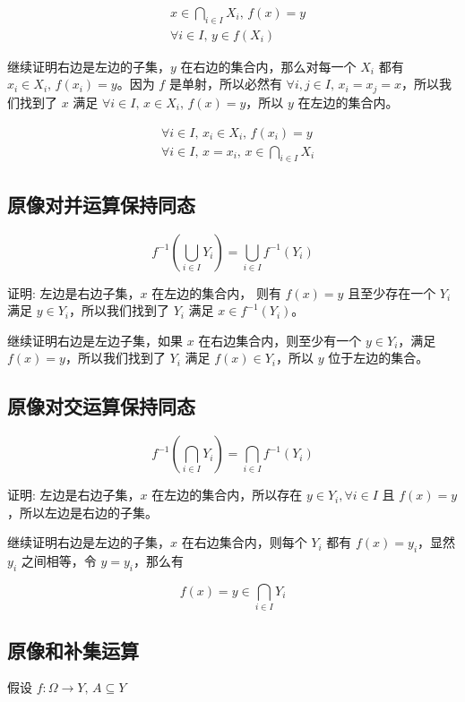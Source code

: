 \begin{align*}
    & x \in \bigcap_{i \in I}X_i,\, f(x) = y \\
    & \forall i \in I,\, y \in f(X_i)
\end{align*}

继续证明右边是左边的子集，$y$ 在右边的集合内，那么对每一个 $X_i$ 都有 $x_i \in X_i,\, f(x_i) = y$。因为 $f$ 是单射，所以必然有 $\forall i,j \in I,\, x_i = x_j = x$，所以我们找到了
$x$ 满足 $\forall i \in I,\, x \in X_i,\, f(x) = y$，所以 $y$ 在左边的集合内。


\begin{align*}
    & \forall i \in I,\, x_i \in X_i,\, f(x_i) = y \\
    & \forall i \in I,\, x = x_i,\, x \in \bigcap_{i \in I}X_i
\end{align*}

\subsection{原像对并运算保持同态}

\[
f^{-1}(\bigcup_{i \in I} Y_i) = \bigcup_{i \in I} f^{-1}(Y_i)
\]


证明: 左边是右边子集，$x$ 在左边的集合内， 则有 $f(x) = y$ 且至少存在一个 $Y_i$ 满足 $y \in Y_i$，所以我们找到了 $Y_i$ 满足 $x \in f^{-1}(Y_i)$。

继续证明右边是左边子集，如果 $x$ 在右边集合内，则至少有一个 $y \in Y_i$，满足 $f(x) = y$，所以我们找到了 $Y_i$ 满足 $f(x) \in Y_i$，所以 
$y$ 位于左边的集合。


\subsection{原像对交运算保持同态}


\[
f^{-1}(\bigcap_{i \in I}Y_i) = \bigcap_{i \in I}f^{-1}(Y_i)
\]

证明: 左边是右边子集，$x$ 在左边的集合内，所以存在 $y \in Y_i, \forall i \in I$ 且 $f(x) = y$，所以左边是右边的子集。

继续证明右边是左边的子集，$x$ 在右边集合内，则每个 $Y_i$ 都有 $f(x) = y_i$，显然 $y_i$ 之间相等，令 $y = y_i$，那么有

\[
f(x) = y \in \bigcap_{i \in I}Y_i
\]

\subsection{原像和补集运算}

假设 $f: \Omega \to Y, \, A \subseteq Y$

